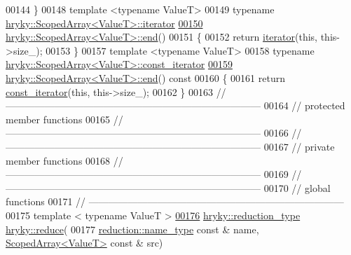 \begin{DoxyCode}
00144 \}
00148 \textcolor{keyword}{template} <\textcolor{keyword}{typename} ValueT>
00149 \textcolor{keyword}{typename} \hyperlink{classhryky_1_1iterator_1_1random_1_1_mutable}{hryky::ScopedArray<ValueT>::iterator}
\hypertarget{scoped__array_8h_source_l00150}{}\hyperlink{classhryky_1_1_scoped_array_ad8e02862ca4c02c24c0c27d6d74bbb28}{00150} \hyperlink{classhryky_1_1_scoped_array_ad8e02862ca4c02c24c0c27d6d74bbb28}{hryky::ScopedArray<ValueT>::end}()
00151 \{
00152     \textcolor{keywordflow}{return} \hyperlink{classhryky_1_1iterator_1_1random_1_1_mutable}{iterator}(\textcolor{keyword}{this}, this->size\_);
00153 \}
00157 \textcolor{keyword}{template} <\textcolor{keyword}{typename} ValueT>
00158 \textcolor{keyword}{typename} \hyperlink{classhryky_1_1iterator_1_1random_1_1_immutable}{hryky::ScopedArray<ValueT>::const_iterator}
\hypertarget{scoped__array_8h_source_l00159}{}\hyperlink{classhryky_1_1_scoped_array_a037bc4e9b2071a052ba7f7fa82dc281d}{00159} \hyperlink{classhryky_1_1_scoped_array_ad8e02862ca4c02c24c0c27d6d74bbb28}{hryky::ScopedArray<ValueT>::end}()\textcolor{keyword}{ const}
00160 \textcolor{keyword}{}\{
00161     \textcolor{keywordflow}{return} \hyperlink{classhryky_1_1iterator_1_1random_1_1_immutable}{const_iterator}(\textcolor{keyword}{this}, this->size\_);
00162 \}
00163 \textcolor{comment}{//
      ------------------------------------------------------------------------------}
00164 \textcolor{comment}{// protected member functions}
00165 \textcolor{comment}{//
      ------------------------------------------------------------------------------}
00166 \textcolor{comment}{//
      ------------------------------------------------------------------------------}
00167 \textcolor{comment}{// private member functions}
00168 \textcolor{comment}{//
      ------------------------------------------------------------------------------}
00169 \textcolor{comment}{//
      ------------------------------------------------------------------------------}
00170 \textcolor{comment}{// global functions}
00171 \textcolor{comment}{//
      ------------------------------------------------------------------------------}
00175 \textcolor{comment}{}\textcolor{keyword}{template} < \textcolor{keyword}{typename} ValueT >
\hypertarget{scoped__array_8h_source_l00176}{}\hyperlink{namespacehryky_aed1bf2a7c53af0daf10e630e023ad6c2}{00176} \hyperlink{classhryky_1_1_intrusive_ptr}{hryky::reduction_type} \hyperlink{namespacehryky_af41cb3af6766761da0ff21b84527a52c}{hryky::reduce}(
00177     \hyperlink{classhryky_1_1reduction_1_1_string}{reduction::name_type} \textcolor{keyword}{const} & name, \hyperlink{classhryky_1_1_scoped_array}{ScopedArray<ValueT>} \textcolor{keyword}{const} & src)

\end{DoxyCode}
